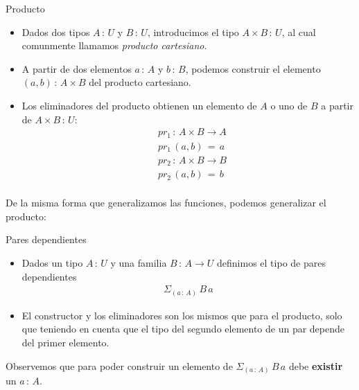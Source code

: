 \documentclass[xcolor=dvipsnames]{beamer} %
\newcommand{\tjud}[2]
  {\ensuremath{#1\,:\,#2}}
\newcommand{\cprod}[2]
  {\ensuremath{#1 \times #2}
 }
\newcommand{\depPair}[3]
 {\ensuremath{\Sigma_{(\tjud{#1}{#2})}\,#3\,#1}
 }
\begin{document}
\begin{frame}
    \begin{block}{Producto}
      \begin{itemize}
       \item Dados dos tipos $\tjud{A}{U}$ y $\tjud{B}{U}$, introducimos el tipo $\tjud{\cprod{A}{B}}{U}$, al cual comunmente llamamos
             \textit{producto cartesiano}. 
       \item A partir de dos elementos $\tjud{a}{A}$ y $\tjud{b}{B}$, podemos construir el elemento $\tjud{(a,b)}{\cprod{A}{B}}$ del producto
       cartesiano.
       \item Los eliminadores del producto obtienen un elemento de $A$ o uno de $B$ a partir de $\tjud{\cprod{A}{B}}{U}$:
            \begin{align*}
              &\tjud{pr_1}{\cprod{A}{B} \rightarrow A}\\
              &pr_1\,(a,b)\,=\,a\\              
              &\tjud{pr_2}{\cprod{A}{B} \rightarrow B}\\
              &pr_2\,(a,b)\,=\,b\\
            \end{align*}
      \end{itemize}
    \end{block}
\end{frame}

\begin{frame}
    \begin{block}{}
     De la misma forma que generalizamos las funciones, podemos generalizar el producto:
    \end{block}
    
    \pause
    
    \begin{block}{Pares dependientes}
      \begin{itemize}
       \item Dados un tipo $\tjud{A}{U}$ y una familia $\tjud{B}{A \rightarrow U}$ definimos el tipo de pares dependientes
              \begin{align*}
              \depPair{a}{A}{B}
              \end{align*}
       \item El constructor y los eliminadores son los mismos que para el producto, solo que teniendo en cuenta que el tipo
             del segundo elemento de un par depende del primer elemento.
      \end{itemize}
    \end{block}
    \pause
    \begin{block}{}
     Observemos que para poder construir un elemento de $\depPair{a}{A}{B}$ debe \textbf{existir} un $\tjud{a}{A}$.
    \end{block}

\end{frame}
\end{document}
